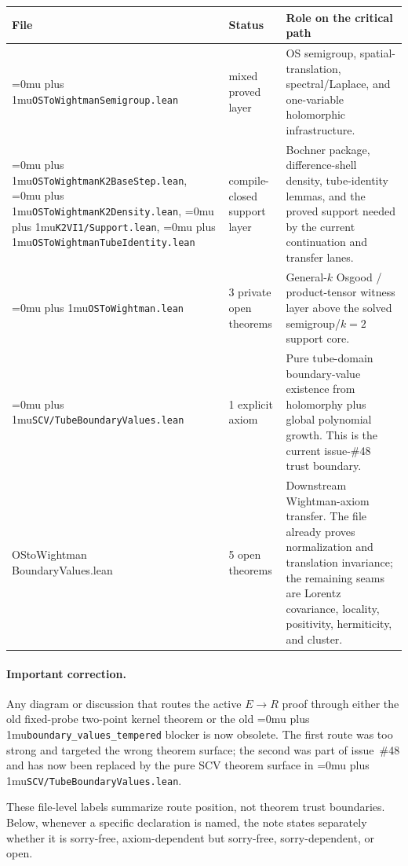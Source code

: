 \documentclass[11pt,a4paper]{article}
\newcommand{\leanfile}[1]{\begingroup\Urlmuskip=0mu plus 1mu\relax\nolinkurl{#1}\endgroup}
\newcommand{\leanname}[1]{\begingroup\Urlmuskip=0mu plus 1mu\relax\nolinkurl{#1}\endgroup}
\begin{document}
{\scriptsize
\begin{longtable}{@{}L{0.23\textwidth}L{0.17\textwidth}L{0.54\textwidth}@{}}
\toprule
\textbf{File} & \textbf{Status} & \textbf{Role on the critical path} \\
\midrule
\endhead
\leanfile{OSToWightmanSemigroup.lean} & mixed proved layer &
OS semigroup, spatial-translation, spectral/Laplace, and one-variable
holomorphic infrastructure. \\
\leanfile{OSToWightmanK2BaseStep.lean}, \leanfile{OSToWightmanK2Density.lean},
\leanfile{K2VI1/Support.lean}, \leanfile{OSToWightmanTubeIdentity.lean}
& compile-closed support layer &
Bochner package, difference-shell density, tube-identity lemmas, and the
proved support needed by the current continuation and transfer lanes. \\
\leanfile{OSToWightman.lean} & 3 private open theorems &
General-$k$ Osgood / product-tensor witness layer above the solved
semigroup/$k=2$ support core. \\
\leanfile{SCV/TubeBoundaryValues.lean} & 1 explicit axiom &
Pure tube-domain boundary-value existence from holomorphy plus global
polynomial growth. This is the current issue-\#48 trust boundary. \\
\parbox[t]{0.23\textwidth}{\ttfamily OStoWightman\\BoundaryValues.lean} & 5 open theorems &
Downstream Wightman-axiom transfer. The file already proves normalization and
translation invariance; the remaining seams are Lorentz covariance, locality,
positivity, hermiticity, and cluster. \\
\bottomrule
\end{longtable}
}

\paragraph{Important correction.}
Any diagram or discussion that routes the active $E \to R$ proof through either
the old fixed-probe two-point kernel theorem or the old
\leanname{boundary\_values\_tempered} blocker is now obsolete. The first route
was too strong and targeted the wrong theorem surface; the second was part of
issue~\#48 and has now been replaced by the pure SCV theorem surface in
\leanfile{SCV/TubeBoundaryValues.lean}.

\medskip\noindent
These file-level labels summarize route position, not theorem trust boundaries.
Below, whenever a specific declaration is named, the note states separately
whether it is sorry-free, axiom-dependent but sorry-free, sorry-dependent, or
open.
\end{document}
